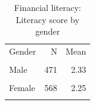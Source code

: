 \begin{table}[htbp]\centering\small
\caption{Financial literacy: Literacy score by gender}
\label{tab:finlit_score_by_gender}
\begin{tabular}{lrr}\toprule
Gender & N & Mean \\\\ \midrule
Male & 471 & 2.33 \\\\
Female & 568 & 2.25 \\\\
\bottomrule
\end{tabular}\end{table}
